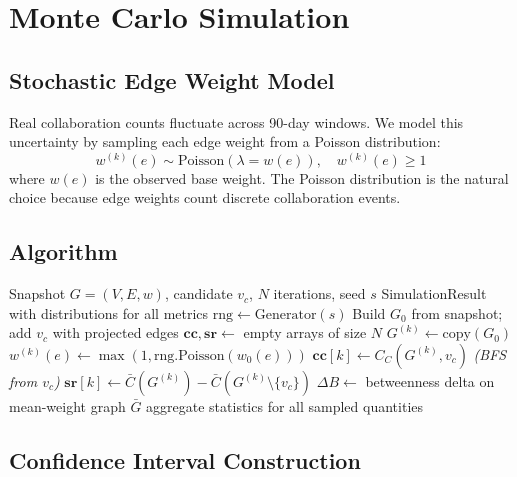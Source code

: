 \documentclass[12pt, a4paper]{article}
\begin{document}
\section{Monte Carlo Simulation}

\subsection{Stochastic Edge Weight Model}

Real collaboration counts fluctuate across 90-day windows.  We model this
uncertainty by sampling each edge weight from a Poisson distribution:
\[
  w^{(k)}(e) \sim \text{Poisson}\!\left(\lambda = w(e)\right), \quad
  w^{(k)}(e) \geq 1
\]
where $w(e)$ is the observed base weight.  The Poisson distribution is the
natural choice because edge weights count discrete collaboration events.

\subsection{Algorithm}

\begin{algorithm}
\caption{STAS Monte Carlo Simulation}
\begin{algorithmic}[1]
\Require Snapshot $G=(V,E,w)$, candidate $v_c$, $N$ iterations, seed $s$
\Ensure SimulationResult with distributions for all metrics
\State $\text{rng} \leftarrow \text{Generator}(s)$ 
\State Build $G_0$ from snapshot; add $v_c$ with projected edges
\State $\mathbf{cc}, \mathbf{sr} \leftarrow$ empty arrays of size $N$
  \State $G^{(k)} \leftarrow \text{copy}(G_0)$
    \State $w^{(k)}(e) \leftarrow \max(1, \text{rng.Poisson}(w_0(e)))$
  \EndFor
  \State $\mathbf{cc}[k] \leftarrow C_C(G^{(k)}, v_c)$ \quad \emph{(BFS from $v_c$)}
  \State $\mathbf{sr}[k] \leftarrow \bar{C}(G^{(k)}) - \bar{C}(G^{(k)} \setminus \{v_c\})$
\EndFor
\State $\Delta B \leftarrow$ betweenness delta on mean-weight graph $\bar{G}$
\State \Return aggregate statistics for all sampled quantities
\end{algorithmic}
\end{algorithm}

\subsection{Confidence Interval Construction}
\end{document}
